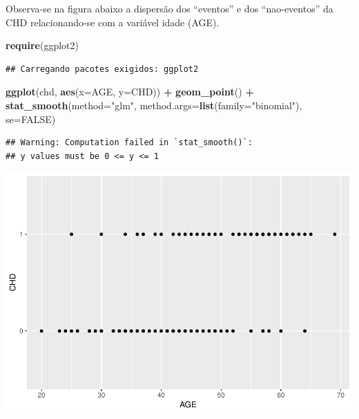 \documentclass[12pt,brazil,]{book}
\newenvironment{Shaded}{\begin{snugshade}}{\end{snugshade}}
\newcommand{\DataTypeTok}[1]{\textcolor[rgb]{0.13,0.29,0.53}{#1}}
\newcommand{\KeywordTok}[1]{\textcolor[rgb]{0.13,0.29,0.53}{\textbf{#1}}}
\newcommand{\NormalTok}[1]{#1}
\newcommand{\OperatorTok}[1]{\textcolor[rgb]{0.81,0.36,0.00}{\textbf{#1}}}
\newcommand{\OtherTok}[1]{\textcolor[rgb]{0.56,0.35,0.01}{#1}}
\newcommand{\StringTok}[1]{\textcolor[rgb]{0.31,0.60,0.02}{#1}}
\begin{document}
Observa-se na figura abaixo a dispersão dos ``eventos'' e dos
``nao-eventos'' da CHD relacionando-se com a variável idade (AGE).

\begin{Shaded}
\begin{Highlighting}[]
\KeywordTok{require}\NormalTok{(ggplot2)}
\end{Highlighting}
\end{Shaded}

\begin{verbatim}
## Carregando pacotes exigidos: ggplot2
\end{verbatim}

\begin{Shaded}
\begin{Highlighting}[]
\KeywordTok{ggplot}\NormalTok{(chd, }\KeywordTok{aes}\NormalTok{(}\DataTypeTok{x=}\NormalTok{AGE, }\DataTypeTok{y=}\NormalTok{CHD)) }\OperatorTok{+}\StringTok{ }
\StringTok{  }\KeywordTok{geom_point}\NormalTok{() }\OperatorTok{+}\StringTok{ }
\StringTok{  }\KeywordTok{stat_smooth}\NormalTok{(}\DataTypeTok{method=}\StringTok{"glm"}\NormalTok{, }\DataTypeTok{method.args=}\KeywordTok{list}\NormalTok{(}\DataTypeTok{family=}\StringTok{"binomial"}\NormalTok{), }\DataTypeTok{se=}\OtherTok{FALSE}\NormalTok{)}
\end{Highlighting}
\end{Shaded}

\begin{verbatim}
## Warning: Computation failed in `stat_smooth()`:
## y values must be 0 <= y <= 1
\end{verbatim}

\includegraphics{05-RegLogist_files/figure-latex/unnamed-chunk-3-1.pdf}
\end{document}
